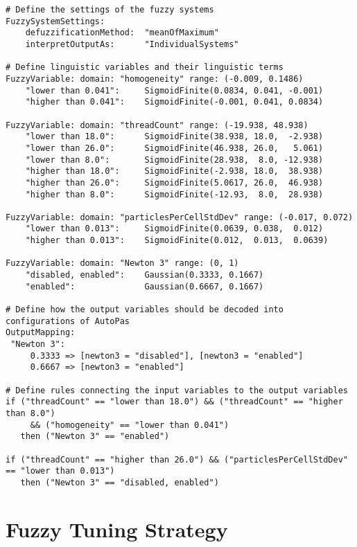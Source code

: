 \begin{lstlisting}[caption={Demonstration of the domain-specific language used for Fuzzy Tuning},label={lst:rulefile},language=FuzzyLanguage]
# Define the settings of the fuzzy systems
FuzzySystemSettings:
    defuzzificationMethod:  "meanOfMaximum"
    interpretOutputAs:      "IndividualSystems"

# Define linguistic variables and their linguistic terms
FuzzyVariable: domain: "homogeneity" range: (-0.009, 0.1486)
    "lower than 0.041":     SigmoidFinite(0.0834, 0.041, -0.001)
    "higher than 0.041":    SigmoidFinite(-0.001, 0.041, 0.0834)

FuzzyVariable: domain: "threadCount" range: (-19.938, 48.938)
    "lower than 18.0":      SigmoidFinite(38.938, 18.0,  -2.938)
    "lower than 26.0":      SigmoidFinite(46.938, 26.0,   5.061)
    "lower than 8.0":       SigmoidFinite(28.938,  8.0, -12.938)
    "higher than 18.0":     SigmoidFinite(-2.938, 18.0,  38.938)
    "higher than 26.0":     SigmoidFinite(5.0617, 26.0,  46.938)
    "higher than 8.0":      SigmoidFinite(-12.93,  8.0,  28.938)
     
FuzzyVariable: domain: "particlesPerCellStdDev" range: (-0.017, 0.072)
    "lower than 0.013":     SigmoidFinite(0.0639, 0.038,  0.012)
    "higher than 0.013":    SigmoidFinite(0.012,  0.013,  0.0639)
  
FuzzyVariable: domain: "Newton 3" range: (0, 1)
    "disabled, enabled":    Gaussian(0.3333, 0.1667)
    "enabled":              Gaussian(0.6667, 0.1667)
      
# Define how the output variables should be decoded into configurations of AutoPas
OutputMapping:
 "Newton 3":
     0.3333 => [newton3 = "disabled"], [newton3 = "enabled"]
     0.6667 => [newton3 = "enabled"]

# Define rules connecting the input variables to the output variables
if ("threadCount" == "lower than 18.0") && ("threadCount" == "higher than 8.0") 
     && ("homogeneity" == "lower than 0.041")
   then ("Newton 3" == "enabled")

if ("threadCount" == "higher than 26.0") && ("particlesPerCellStdDev" == "lower than 0.013")
   then ("Newton 3" == "disabled, enabled")
\end{lstlisting}



\section{Fuzzy Tuning Strategy}
\label{sec:fuzzyTuningStrategy}

